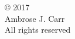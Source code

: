 
\thispagestyle{empty} %
\null\vfill %
\begin{center}
  \SingleSpace %
© 2017\\
Ambrose J. Carr\\
All rights reserved\\
\end{center}
